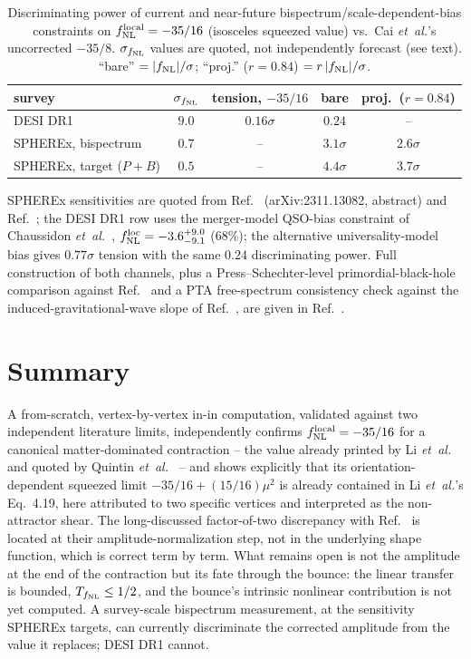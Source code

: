 \documentclass[aps,prd,reprint,superscriptaddress,showpacs,preprintnumbers,nofootinbib,longbibliography,floatfix]{revtex4-2}
\newcommand{\fnl}{f_{\rm NL}}
\newcommand{\etal}{\textit{et~al.}}
\begin{document}
\begin{table}[t]
\caption{Discriminating power of current and near-future bispectrum/scale-dependent-bias
constraints on $f_{\rm NL}^{\rm local}=-35/16$ (isosceles squeezed value) vs.\ Cai
\etal's uncorrected $-35/8$. $\sigma_{f_{\rm NL}}$ values are quoted, not independently
forecast (see text). ``bare'' $=|f_{\rm NL}|/\sigma$; ``proj.'' ($r{=}0.84$)
$=r\,|f_{\rm NL}|/\sigma$.}
\label{tab:reach}
\begin{ruledtabular}
\begin{tabular}{lcccc}
survey & $\sigma_{f_{\rm NL}}$ & tension, $-35/16$ & bare & proj.\ ($r{=}0.84$) \\
\hline
DESI DR1~\cite{Chaussidon:2024} & $9.0$ & $0.16\sigma$ & $0.24$ & -- \\
SPHEREx, bispectrum & $0.7$ & -- & $3.1\sigma$ & $2.6\sigma$ \\
SPHEREx, target ($P{+}B$) & $0.5$ & -- & $4.4\sigma$ & $3.7\sigma$ \\
\end{tabular}
\end{ruledtabular}
\end{table}

SPHEREx sensitivities are quoted from Ref.~\cite{Heinrich:2023}
(arXiv:2311.13082, abstract) and Ref.~\cite{Dore:2014}; the DESI DR1 row uses the
merger-model QSO-bias constraint of Chaussidon \etal~\cite{Chaussidon:2024},
$f_{\rm NL}^{\rm loc}=-3.6^{+9.0}_{-9.1}$ (68\%); the alternative universality-model bias
gives $0.77\sigma$ tension with the same $0.24$ discriminating power. Full construction of
both channels, plus a Press--Schechter-level primordial-black-hole comparison against
Ref.~\cite{Choudhury:2025} and a PTA free-spectrum consistency check against the
induced-gravitational-wave slope of Ref.~\cite{Papanikolaou:2025}, are given in
Ref.~\cite{Golden2026Multichannel}.

\section{Summary}

A from-scratch, vertex-by-vertex in-in computation, validated against two independent
literature limits, independently confirms $f_{\rm NL}^{\rm local}=-35/16$ for a canonical
matter-dominated contraction -- the value already printed by Li \etal~\cite{Li:2016} and
quoted by Quintin \etal~\cite{Quintin:2015} -- and shows explicitly that its
orientation-dependent squeezed limit $-35/16+(15/16)\mu^2$ is already contained in Li
\etal's Eq.~4.19, here attributed to two specific vertices and interpreted as the
non-attractor shear. The long-discussed factor-of-two discrepancy with
Ref.~\cite{Cai:2009fn} is located at their amplitude-normalization step, not in the
underlying shape function, which is correct term by term. What remains open is not the
amplitude at the end of the contraction but its fate through the bounce: the linear
transfer is bounded, $T_{\fnl}\le1/2$, and the bounce's intrinsic nonlinear contribution
is not yet computed. A survey-scale bispectrum measurement, at the sensitivity SPHEREx
targets, can currently discriminate the corrected amplitude from the value it replaces;
DESI DR1 cannot.
\end{document}
